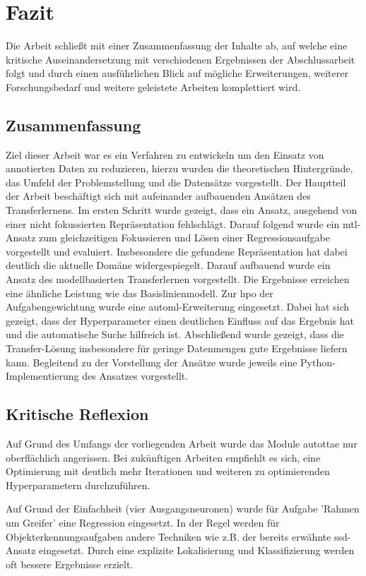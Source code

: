\chapter{Fazit}
\label{chap:Fazit}
Die Arbeit schließt mit einer Zusammenfassung der Inhalte ab, auf welche eine kritische Auseinandersetzung mit verschiedenen Ergebnissen der Abschlussarbeit folgt und durch einen ausführlichen Blick auf mögliche Erweiterungen, weiterer Forschungsbedarf und weitere geleistete Arbeiten komplettiert wird.
 
	\section{Zusammenfassung}
	\label{sec:Zusammenfassung}
	Ziel dieser Arbeit war es ein Verfahren zu entwickeln um den Einsatz von annotierten Daten zu reduzieren, hierzu wurden die theoretischen Hintergründe, das Umfeld der Problemstellung und die Datensätze vorgestellt. Der Hauptteil der Arbeit beschäftigt sich mit aufeinander aufbauenden Ansätzen des Transferlernens. Im ersten Schritt wurde gezeigt, dass ein Ansatz, ausgehend von einer nicht fokussierten Repräsentation fehlschlägt. Darauf folgend wurde ein \acl{mtl}-Ansatz zum gleichzeitigen Fokussieren und Lösen einer Regressionsaufgabe vorgestellt und evaluiert. Insbesondere die gefundene Repräsentation hat dabei deutlich die aktuelle Domäne widergespiegelt. Darauf aufbauend wurde ein Ansatz des modellbasierten Transferlernen vorgestellt. Die Ergebnisse erreichen eine ähnliche Leistung wie das Basislinienmodell. Zur \ac{hpo} der Aufgabengewichtung wurde eine \ac{automl}-Erweiterung eingesetzt. Dabei hat sich gezeigt, dass der Hyperparameter einen deutlichen Einfluss auf das Ergebnis hat und die automatische Suche hilfreich ist. Abschließend wurde gezeigt, dass die Transfer-Lösung insbesondere für geringe Datenmengen gute Ergebnisse liefern kann. Begleitend zu der Vorstellung der Ansätze wurde jeweils eine Python-Implementierung des Ansatzes vorgestellt. 
	
	\section{Kritische Reflexion}
	\label{sec:KritischeReflexion}
	Auf Grund des Umfangs der vorliegenden Arbeit wurde das Module \ac{autottae} nur oberflächlich angerissen. Bei zukünftigen Arbeiten empfiehlt es sich, eine Optimierung mit deutlich mehr Iterationen und weiteren zu optimierenden Hyperparametern durchzuführen.
	
	Auf Grund der Einfachheit (vier Ausgangsneuronen) wurde für  Aufgabe 'Rahmen um Greifer' eine Regression eingesetzt. In der Regel werden für Objekterkennungsaufgaben andere Techniken wie z.B. der bereits erwähnte \ac{ssd}-Ansatz eingesetzt. Durch eine explizite Lokalisierung und Klassifizierung werden oft bessere Ergebnisse erzielt.
	
